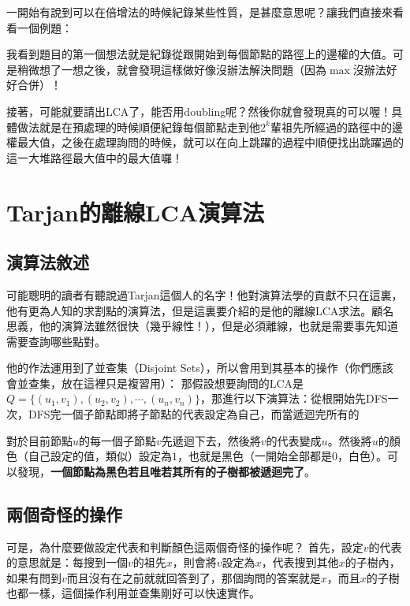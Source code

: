 		一開始有說到可以在倍增法的時候紀錄某些性質，是甚麼意思呢？讓我們直接來看看一個例題：
		
		
		我看到題目的第一個想法就是紀錄從跟開始到每個節點的路徑上的邊權的大值。可是稍微想了一想之後，就會發現這樣做好像沒辦法解決問題（因為$\max$沒辦法好好合併）！
		
		接著，可能就要請出LCA了，能否用doubling呢？然後你就會發現真的可以喔！具體做法就是在預處理的時候順便紀錄每個節點走到他$2^k$輩祖先所經過的路徑中的邊權最大值，之後在處理詢問的時候，就可以在向上跳躍的過程中順便找出跳躍過的這一大堆路徑最大值中的最大值囉！
	
	\section{Tarjan的離線LCA演算法}
		\subsection{演算法敘述}
		可能聰明的讀者有聽說過Tarjan這個人的名字！他對演算法學的貢獻不只在這裏，他有更為人知的求割點的演算法，但是這裏要介紹的是他的離線LCA求法。顧名思義，他的演算法雖然很快（幾乎線性！），但是必須離線，也就是需要事先知道需要查詢哪些點對。
		
		他的作法運用到了並查集（Disjoint Sets），所以會用到其基本的操作（你們應該會並查集，放在這裡只是複習用）：
		那假設想要詢問的LCA是$Q = \{(u_1, v_1), (u_2, v_2), \cdots, (u_n, v_n)\}$，那進行以下演算法：從根開始先DFS一次，DFS完一個子節點即將子節點的代表設定為自己，而當遞迴完所有的
		
		對於目前節點$u$的每一個子節點$v$先遞迴下去，然後將$v$的代表變成$u$。然後將$u$的顏色（自己設定的值，類似）設定為$1$，也就是黑色（一開始全部都是$0$，白色）。可以發現，\textbf{一個節點為黑色若且唯若其所有的子樹都被遞迴完了}。
		\subsection{兩個奇怪的操作}
		可是，為什麼要做設定代表和判斷顏色這兩個奇怪的操作呢？
		首先，設定$v$的代表的意思就是：每搜到一個$v$的祖先$x$，則會將$v$\inline{)}設定為$x$，代表搜到其他$x$的子樹內，如果有問到$v$而且沒有在之前就就回答到了，那個詢問的答案就是$x$，而且$x$的子樹也都一樣，這個操作利用並查集剛好可以快速實作。
		
